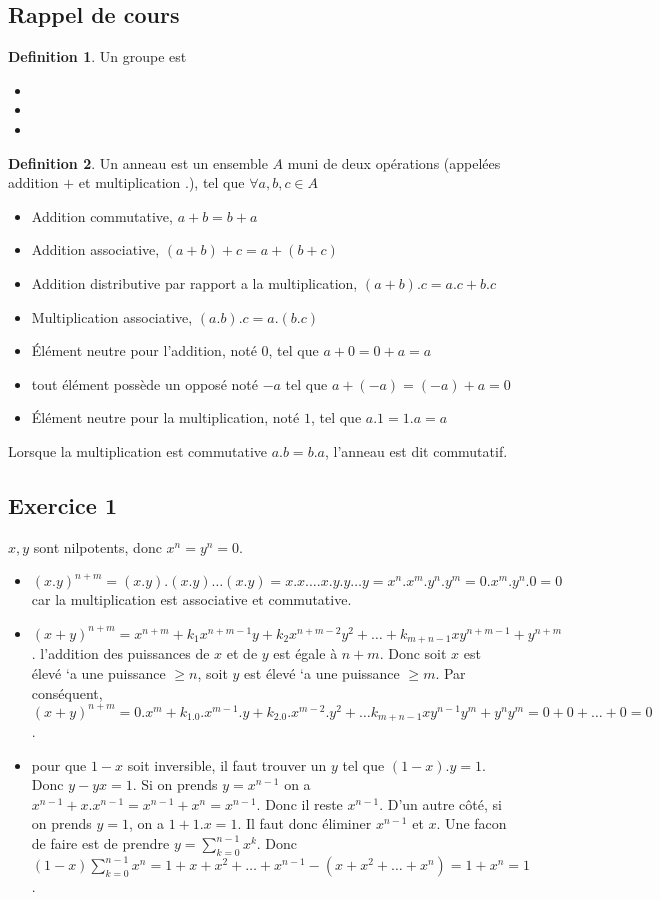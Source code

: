 \documentclass[]{book}
\theoremstyle{definition}
\newtheorem{defn}{Definition}
\begin{document}
\subsection*{Rappel de cours}
\begin{defn}
Un groupe est 
\begin{itemize}
\item 
\item 
\item 
\end{itemize}  
\end{defn}

\begin{defn}
Un anneau est un ensemble $A$ muni de deux op\'erations (appel\'ees addition $+$ et multiplication $.$), tel que $\forall a, b, c \in A$
\begin{itemize}
\item Addition commutative, $a+b = b+a$
\item Addition associative, $(a+b)+c = a+(b+c)$
\item Addition distributive par rapport a la multiplication, $(a+b).c = a.c + b.c$
\item Multiplication associative, $(a.b).c = a.(b.c)$ 
\item \'El\'ement neutre pour l'addition, not\'e $0$, tel que $a+0=0+a=a$
\item tout \'el\'ement poss\`ede un oppos\'e not\'e $-a$ tel que $a+(-a) = (-a) + a = 0$
\item \'El\'ement neutre pour la multiplication, not\'e $1$, tel que $a.1=1.a=a$
\end{itemize}  
Lorsque la multiplication est commutative $a.b=b.a$, l'anneau est dit commutatif.
\end{defn}


\newpage
\subsection*{Exercice 1}
$x, y$ sont nilpotents, donc $x^n= y^n = 0$.
\begin{itemize}
\item $(x.y)^{n+m}= (x.y).(x.y)\ldots (x.y) = x.x\ldots.x.y.y\ldots y = x^n.x^m.y^n.y^m = 0.x^m.y^n.0 = 0$ car la multiplication est associative et commutative.
\item $(x+y)^{n+m} = x^{n+m} + k_1x^{n+m-1}y + k_2x^{n+m-2}y^{2} + \ldots + k_{m+n-1}xy^{n+m-1} + y^{n+m}$. l'addition des puissances de $x$ et de $y$ est \'egale \`a $n+m$. Donc soit $x$ est \'elev\'e `a une puissance $\geq n$, soit $y$ est \'elev\'e `a une puissance $\geq m$. Par cons\'equent, $(x+y)^{n+m} = 0.x^m + k_1.0.x^{m-1}.y + k_2.0.x^{m-2}.y^{2}+ \ldots k_{m+n-1}xy^{n-1}y^{m} + y^{n}y^{m} = 0+0+ \ldots + 0 = 0$.
\item pour que $1-x$ soit inversible, il faut trouver un $y$ tel que $(1-x).y = 1$. Donc $y - yx = 1$. Si on prends $y=x^{n-1}$ on a $x^{n-1}+x.x^{n-1} = x^{n-1}+x^{n} = x^{n-1}$. Donc il reste $x^{n-1}$. D'un autre c\^ot\'e, si on prends $y=1$, on a $1+1.x = 1$. Il faut donc \'eliminer $x^{n-1}$ et $x$. Une facon de faire est de prendre $y = \sum_{k=0}^{n-1}x^{k}$. Donc $(1-x)\sum_{k=0}^{n-1}x^{n} = 1+x+x^2+\ldots+x^{n-1}-(x+x^2+\ldots+x^{n}) = 1+x^{n} = 1$.
\end{itemize}
\end{document}
